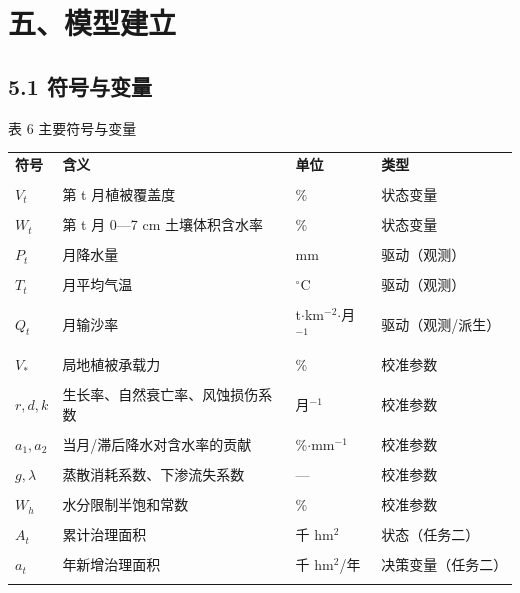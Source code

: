 \documentclass[11pt,a4paper]{ctexart}
\begin{document}
\section*{五、模型建立}

\subsection*{5.1 符号与变量}
表 6  主要符号与变量


\begin{table}[H]\centering\small\setlength{\parskip}{2pt}
\begin{tabularx}{\textwidth}{|X|X|X|X|}
\toprule
\textbf{符号} & \textbf{含义} & \textbf{单位} & \textbf{类型} \\\\
\midrule
$V_{t}$ & 第 t 月植被覆盖度 & \% & 状态变量 \\\\
$W_{t}$ & 第 t 月 0—7 cm 土壤体积含水率 & \% & 状态变量 \\\\
$P_{t}$ & 月降水量 & mm & 驱动（观测） \\\\
$T_{t}$ & 月平均气温 & $^{\circ}$C & 驱动（观测） \\\\
$Q_{t}$ & 月输沙率 & t$\cdot$km$^{-2}$$\cdot$月$^{-1}$ & 驱动（观测/派生） \\\\
$V_{*}$ & 局地植被承载力 & \% & 校准参数 \\\\
$r,d,k$ & 生长率、自然衰亡率、风蚀损伤系数 & 月$^{-1}$ & 校准参数 \\\\
$a_{1},a_{2}$ & 当月/滞后降水对含水率的贡献 & \%$\cdot$mm$^{-1}$ & 校准参数 \\\\
$g,{\lambda}$ & 蒸散消耗系数、下渗流失系数 & — & 校准参数 \\\\
$W_{h}$ & 水分限制半饱和常数 & \% & 校准参数 \\\\
$A_{t}$ & 累计治理面积 & 千 hm$^{2}$ & 状态（任务二） \\\\
$a_{t}$ & 年新增治理面积 & 千 hm$^{2}$/年 & 决策变量（任务二） \\\\
\bottomrule
\end{tabularx}
\end{table}
\end{document}
